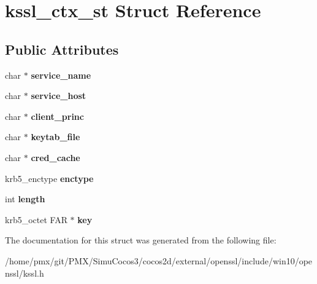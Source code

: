 \hypertarget{structkssl__ctx__st}{}\section{kssl\+\_\+ctx\+\_\+st Struct Reference}
\label{structkssl__ctx__st}
\subsection*{Public Attributes}
\begin{DoxyCompactItemize}
\item 
\mbox{\label{structkssl__ctx__st_aa3718a1a94ac4672f04ca7954a98a223}} 
char $\ast$ {\bfseries service\+\_\+name}
\item 
\mbox{\label{structkssl__ctx__st_a9e935f8bd1ec769ea106132b4f9740a1}} 
char $\ast$ {\bfseries service\+\_\+host}
\item 
\mbox{\label{structkssl__ctx__st_a3f6597936d5553b09f5d1d8884447497}} 
char $\ast$ {\bfseries client\+\_\+princ}
\item 
\mbox{\label{structkssl__ctx__st_a062001f88d34d875c9ff6a6617d50e05}} 
char $\ast$ {\bfseries keytab\+\_\+file}
\item 
\mbox{\label{structkssl__ctx__st_a80431e8d0b576a77f20d4db223ac93ab}} 
char $\ast$ {\bfseries cred\+\_\+cache}
\item 
\mbox{\label{structkssl__ctx__st_a04ef1cbb535de6f76263cf5ab320c44d}} 
krb5\+\_\+enctype {\bfseries enctype}
\item 
\mbox{\label{structkssl__ctx__st_a45cb713dc110c383dbcedff5ab5ddf61}} 
int {\bfseries length}
\item 
\mbox{\label{structkssl__ctx__st_a5732159f66408b496e367b88685835af}} 
krb5\+\_\+octet F\+AR $\ast$ {\bfseries key}
\end{DoxyCompactItemize}


The documentation for this struct was generated from the following file\+:\begin{DoxyCompactItemize}
\item 
/home/pmx/git/\+P\+M\+X/\+Simu\+Cocos3/cocos2d/external/openssl/include/win10/openssl/kssl.\+h\end{DoxyCompactItemize}
